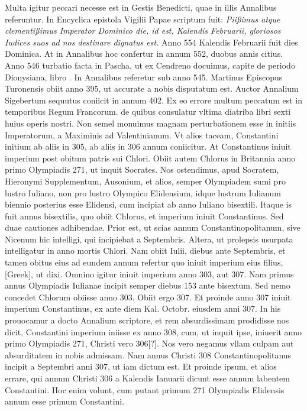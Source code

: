 Multa igitur peccari necesse est
in Gestis Benedicti, quae in illis Annalibus referuntur.
In Encyclica
epistola Vigilii Papae scriptum fuit: \textit{Piißimus atque clementißimus
Imperator Dominico die, id est, Kalendis Februarii, gloriosos Iudices suos
ad nos destinare dignatus est.}
Anno 554 Kalendis Februarii fuit dies
Dominica.
At in Annalibus hoc confertur in annum 552, duobus
annis citius.
Anno 546 turbatio facta in Pascha, ut ex Cendreno docuimus,
capite de periodo Dionysiana, libro .
In Annalibus referetur
sub anno 545.
Martinus Episcopus Turonensis obiit anno
395, ut accurate a nobis disputatum est.
Auctor Annalium Sigebertum
sequutus coniicit in annum 402.
Ex eo errore multum peccatum
est in temporibus Regum Francorum.
de quibus consulatur vltima
diatriba libri sexti huius operis nostri.
Non semel monuimus magnam
perturbationem esse in initiis Imperatorum, a Maximinis
ad Valentinianum.
Vt alios taceam, Constantini initium ab aliis in
305, ab aliis in 306 annum coniicitur.
At Constantinus iniuit imperium
post obitum patris sui Chlori.
Obiit autem Chlorus in Britannia
anno primo Olympiadis 271, ut inquit Socrates.
Nos ostendimus,
apud Socratem, Hieronymi Supplementum, Ausonium, et alios,
semper Olympiadem sumi pro lustro Iuliano, non pro lustro Olympico
Elidensium, idque lustrum Iulianum biennio posterius esse Elidensi,
cum incipiat ab anno Iuliano bisextili.
Itaque is fuit annus bisextilis,
quo obiit Chlorus, et imperium iniuit Constantinus.
Sed duae
cautiones adhibendae.
Prior est, ut scias annum Constantinopolitanum,
sive Nicenum hic intelligi, qui incipiebat a  Septembris.
Altera, ut prolepsis usurpata intelligatur in anno mortis Chlori.
Nam obiit  Iulii,  diebus ante
 Septembris, et
tamen obitus eius ad eundem annum refertur quo iniuit imperium
eius filius, \textgreek{[Greek]}, ut dixi.
Omnino igitur iniuit imperium anno
303, aut 307.
Nam primus annus Olympiadis Iulianae incipit semper
diebus 153 ante bisextum.
Sed nemo concedet Chlorum obiisse
anno 303.
Obiit ergo 307.
Et proinde anno 307 iniuit imperium
Constantinus, ex ante diem  Kal. Octobr. eiusdem anni 307.
In his prouocamur a docto Annalium scriptore, et rem absurdissimam
prodidisse nos dicit, Constantini imperium iniisse ex anno
308, cum, ut inquit ipse, iniuerit anno primo Olympiadis 271,
Christi vero 306[?].
Nos vero negamus vllam culpam aut absurditatem
in nobis admissam.
Nam annus Christi 308 Constantinopolitanus
incipit a Septembri anni 307, ut iam dictum est.
Et proinde ipsum, et alios errare, qui annum Christi 306 a
 Kalendis Ianuarii
dicunt esse annum labentem Constantini.
Hoc enim volunt,
cum putant primum 271 Olympiadis Elidensis annum esse primum
Constantini.

